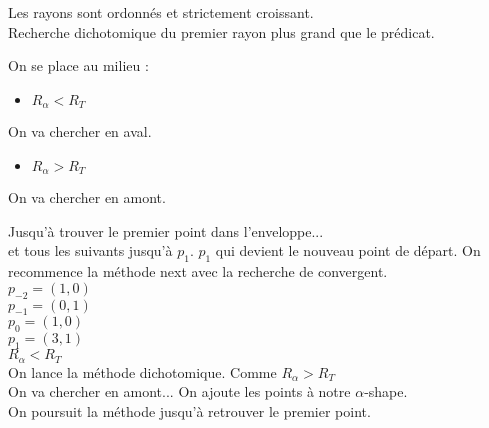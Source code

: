 \documentclass{beamer}
\begin{document}
\begin{frame}
\begin{columns}[t]
\begin{column}{3cm}
\begin{block}{}
{        }
        {
          Les rayons sont ordonnés et strictement croissant.\\
          Recherche dichotomique du premier rayon plus grand que le prédicat.\\
        }        
        {
          On se place au milieu :
          \begin{itemize}
            \item $R_{\alpha} < R_T$
          \end{itemize} 
          On va chercher en aval.
        }
        {
          \begin{itemize}
            \item $R_{\alpha} > R_T$
          \end{itemize}
          On va chercher en amont.
        }
        {
          Jusqu'à trouver le premier point dans l'enveloppe...\\          
        }
        {
          et tous les suivants jusqu'à $p_1$.     
        }
        {
          $p_1$ qui devient le nouveau point de départ.
        }
        {
          On recommence la méthode next avec la recherche de convergent.\\
          $p_{-2} = (1, 0)$\\
          $p_{-1} = (0, 1)$\\
          $p_{0} = (1, 0)$\\
          $p_{1} = (3, 1)$\\
        }
        {
          $R_{\alpha} < R_T$\\
          On lance la méthode dichotomique. 
        }
        {
          Comme $R_{\alpha} > R_T$\\
          On va chercher en amont...
        }
        {
          On ajoute les points à notre $\alpha$-shape.\\
        }
        {
          On poursuit la méthode jusqu'à retrouver le premier point.
        }  
      \end{block}
     
    \end{column}
  \end{columns} 

\end{frame}
\end{document}
